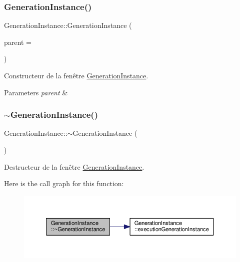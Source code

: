 \subsubsection{\texorpdfstring{Generation\+Instance()}{GenerationInstance()}}
{\footnotesize\ttfamily Generation\+Instance\+::\+Generation\+Instance (\begin{DoxyParamCaption}\item[{Q\+Widget $\ast$}]{parent = {} }\end{DoxyParamCaption})\hspace{0.3cm}{\ttfamily [explicit]}}



Constructeur de la fenêtre \hyperlink{classGenerationInstance}{Generation\+Instance}. 


\begin{DoxyParams}{Parameters}
{\em parent} & \\
\hline
\end{DoxyParams}
\mbox{\label{classGenerationInstance_a14cdea0af4a47deb38a3a5fa59bb6d40}} 
\subsubsection{\texorpdfstring{$\sim$\+Generation\+Instance()}{~GenerationInstance()}}
{\footnotesize\ttfamily Generation\+Instance\+::$\sim$\+Generation\+Instance (\begin{DoxyParamCaption}{ }\end{DoxyParamCaption})}



Destructeur de la fenêtre \hyperlink{classGenerationInstance}{Generation\+Instance}. 

Here is the call graph for this function\+:\nopagebreak
\begin{figure}[H]
\begin{center}
\leavevmode
\includegraphics[width=350pt]{classGenerationInstance_a14cdea0af4a47deb38a3a5fa59bb6d40_cgraph}
\end{center}
\end{figure}


